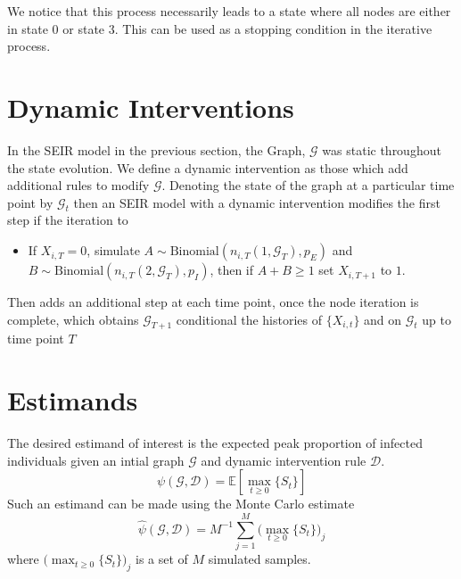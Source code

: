\documentclass{article}
\newcommand{\e}[1]{{\mathbb E}\left[ #1 \right]}
\begin{document}
    We notice that this process necessarily leads to a state where all nodes are either in state 0 or state 3. This can be used
    as a stopping condition in the iterative process.

    \section{Dynamic Interventions}

    In the SEIR model in the previous section, the Graph, $\mathcal{G}$ was static throughout the state evolution.
    We define a dynamic intervention as those which add additional rules to modify $\mathcal{G}$. Denoting the state of the
    graph at a particular time point by $\mathcal{G}_t$ then an SEIR model with a dynamic intervention modifies the first
    step if the iteration to
    \begin{itemize}
        \item If $X_{i,T} = 0$, simulate $A \sim \text{Binomial}(n_{i,T}(1,\mathcal{G}_T),p_E)$ and
              $B \sim \text{Binomial}(n_{i,T}(2,\mathcal{G}_T),p_I)$, then if $A+B \geq 1$ set $X_{i,T+1}$ to $1$.
    \end{itemize}
    Then adds an additional step at each time point, once the node iteration is complete, which obtains $\mathcal{G}_{T+1}$
    conditional the histories of $\{X_{i,t}\}$ and on $\mathcal{G}_t$ up to time point $T$

    \section{Estimands}

    The desired estimand of interest is the expected peak proportion of infected individuals given an intial graph $\mathcal{G}$
    and dynamic intervention rule $\mathcal{D}$.
    \begin{equation}
        \psi(\mathcal{G},\mathcal{D}) = \e{\max_{t \geq 0 } \{S_t\} }
    \end{equation}
    Such an estimand can be made using the Monte Carlo estimate
    \begin{equation}
        \hat{\psi}(\mathcal{G},\mathcal{D}) = M^{-1} \sum_{j=1}^{M} \big(\max_{t \geq 0 } \{S_t\}\big)_j
    \end{equation}
    where $\big(\max_{t \geq 0 } \{S_t\}\big)_j$ is a set of $M$ simulated samples.
\end{document}
